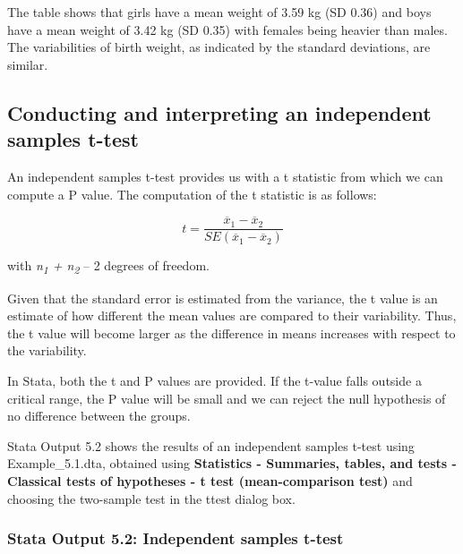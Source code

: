 \documentclass[
]{memoir}
\begin{document}
The table shows that girls have a mean weight of 3.59 kg (SD 0.36) and boys have a mean weight of 3.42 kg (SD 0.35) with females being heavier than males. The variabilities of birth weight, as indicated by the standard deviations, are similar.

\hypertarget{conducting-and-interpreting-an-independent-samples-t-test}{%
\subsection{Conducting and interpreting an independent samples t-test}\label{conducting-and-interpreting-an-independent-samples-t-test}}

An independent samples t-test provides us with a t statistic from which we can compute a P value. The computation of the t statistic is as follows:

\[t = \frac{{\overline{x}}_{1} - {\overline{x}}_{2}}{SE({\overline{x}}_{1} - {\overline{x}}_{2})}\]

with \emph{n\textsubscript{1} + n\textsubscript{2}} -- 2 degrees of freedom.

Given that the standard error is estimated from the variance, the t value is an estimate of how different the mean values are compared to their variability. Thus, the t value will become larger as the difference in means increases with respect to the variability.

In Stata, both the t and P values are provided. If the t-value falls outside a critical range, the P value will be small and we can reject the null hypothesis of no difference between the groups.

Stata Output 5.2 shows the results of an independent samples t-test using Example\_5.1.dta, obtained using \textbf{Statistics - Summaries, tables, and tests - Classical tests of hypotheses - t test (mean-comparison test)} and choosing the two-sample test in the ttest dialog box.

\hypertarget{stata-output-5.2-independent-samples-t-test}{%
\subsubsection*{Stata Output 5.2: Independent samples t-test}\label{stata-output-5.2-independent-samples-t-test}}
\end{document}
